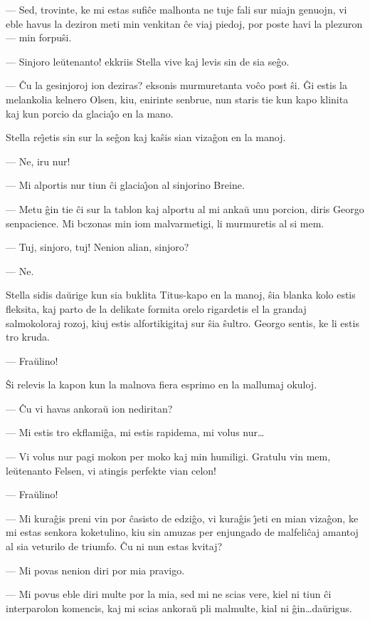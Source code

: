  --- Sed, trovinte, ke mi estas sufi\^ce malhonta ne tuje fali sur miajn
genuojn, vi eble havus la deziron meti min venkitan \^ce viaj
piedoj, por poste havi la plezuron --- min forpu\^si.

 --- Sinjoro le\u utenanto! ekkriis Stella vive kaj levis sin de sia
se\^go.

 --- \^Cu la gesinjoroj ion deziras? eksonis murmuretanta vo\^co post
\^si. \^Gi estis la melankolia kelnero Olsen, kiu, enirinte senbrue,
nun staris tie kun kapo klinita kaj kun porcio da glacia\^{\j}o en
la mano.

   Stella re\^{\j}etis sin sur la se\^gon kaj ka\^sis sian viza\^gon en la
manoj.

 --- Ne, iru nur!

 --- Mi alportis nur tiun \^ci glacia\^{\j}on al sinjorino Breine.

 --- Metu \^gin tie \^ci sur la tablon kaj alportu al mi anka\u u unu
porcion, diris Georgo senpacience. Mi bczonas min iom malvarmetigi,
li murmuretis al si mem.

 --- Tuj, sinjoro, tuj! Nenion alian, sinjoro?

 --- Ne.

   Stella sidis da\u urige kun sia buklita Titus-kapo en la manoj, \^sia
blanka kolo estis fleksita, kaj parto de la delikate formita orelo
rigardetis el la grandaj salmokoloraj rozoj, kiuj estis
alfortikigitaj sur \^sia \^sultro. Georgo sentis, ke li estis tro
kruda.

 --- Fra\u ulino!

   \^Si relevis la kapon kun la malnova fiera esprimo en la mallumaj
okuloj.

 --- \^Cu vi havas ankora\u u ion nediritan?

 --- Mi estis tro ekflami\^ga, mi estis rapidema, mi volus nur\dots

 --- Vi volus nur pagi mokon per moko kaj min humiligi. Gratulu vin
mem, le\u utenanto Felsen, vi atingis perfekte vian celon!

 --- Fra\u ulino!

 --- Mi kura\^gis preni vin por \^casisto de edzi\^go, vi kura\^gis \^{\j}eti
en mian viza\^gon, ke mi estas senkora koketulino, kiu sin amuzas
per enjungado de malfeli\^caj amantoj al sia veturilo de triumfo.
\^Cu ni nun estas kvitaj?

 --- Mi povas nenion diri por mia pravigo.

 --- Mi povus eble diri multe por la mia, sed mi ne scias vere, kiel ni
tiun \^ci interparolon komencis, kaj mi scias ankora\u u pli
malmulte, kial ni \^gin\dots da\u urigus.


